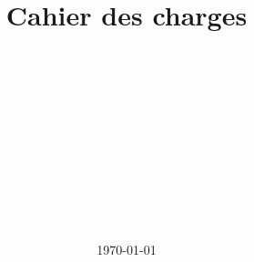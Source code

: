 \usepackage[utf8]{inputenc}

\usepackage[T1]{fontenc}
\usepackage{fontawesome}
\usepackage{eurosym}

\usepackage[french]{babel}

\usepackage{fancyhdr}
\usepackage{graphicx}
\usepackage[left=4cm,right=4cm,top=4.2cm,bottom=4cm,textheight=28cm]{geometry}

\usepackage{eso-pic}
\usepackage{transparent}

\usepackage{hyperref}
\usepackage{setspace}

\usepackage{titletoc}


\newcommand\BackgroundPic{%
	\put(0,-50){%
		\parbox[b][\paperheight]{\paperwidth}{%
			\centering
			\texttt{[image: ../images/icone.jpg]}%
			\vfill
		}
	}
}

  
\renewcommand{\baselinestretch}{1.15}
\renewcommand{\partname}{}

\title{\textbf{{\Huge Cahier des charges}}}
\author{
	\\
	 \\ \\ \\
	 \\
	 \\
	 \\
	 \\ \\ \\
}
\date{{\LARGE \today}}

\pagestyle{fancy}

